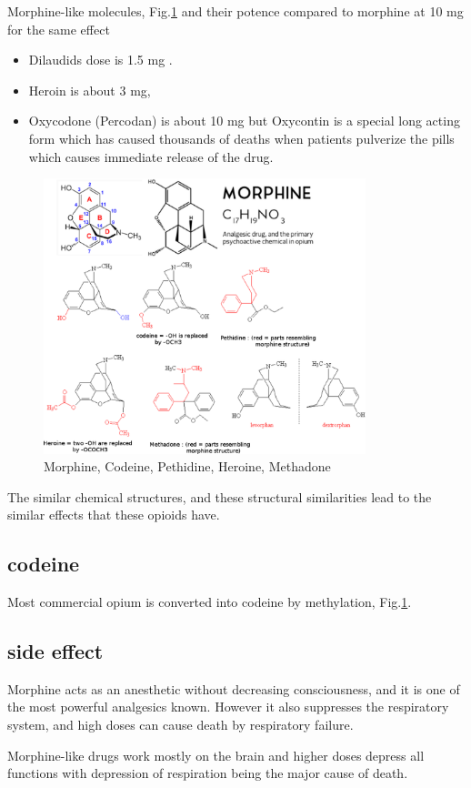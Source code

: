 Morphine-like molecules, Fig.\ref{fig:morphine} and their potence compared to
morphine at 10 mg for the same effect
\begin{itemize}
  \item Dilaudids dose is 1.5 mg .
  
  \item Heroin is about 3 mg, 
  
  \item Oxycodone (Percodan) is about 10 mg but Oxycontin is a special long
  acting form which has caused thousands of deaths when patients pulverize the
  pills which causes immediate release of the drug.
  
\end{itemize}

 \begin{figure}[hbt]
  \centerline{\includegraphics[height=8cm,
    angle=0]{./images/morphine.eps}}
  \caption{Morphine, Codeine, Pethidine, Heroine, Methadone}
\label{fig:morphine}
\end{figure}

The similar chemical structures, and these structural similarities lead to the
similar effects that these opioids have.


\subsection{codeine}
\label{sec:codeine}

Most commercial opium is converted into codeine by methylation,
Fig.\ref{fig:morphine}.
 

\subsection{side effect}

Morphine acts as an anesthetic without decreasing consciousness, and it is one
of the most powerful analgesics known. However it also suppresses the
respiratory system, and high doses can cause death by respiratory failure.

Morphine-like drugs work mostly on the brain and higher doses depress all
functions with depression of respiration being the major cause of death. 






